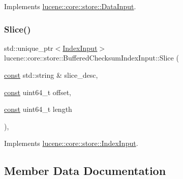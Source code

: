 Implements \mbox{\hyperlink{classlucene_1_1core_1_1store_1_1DataInput_aa5f24102b9b50a190bcb7a8edb82ea2d}{lucene\+::core\+::store\+::\+Data\+Input}}.

\mbox{\label{classlucene_1_1core_1_1store_1_1BufferedChecksumIndexInput_a3dbbd2618e6ab6dfeee220ae5b6b8cda}} 
\subsubsection{\texorpdfstring{Slice()}{Slice()}}
{\footnotesize\ttfamily std\+::unique\+\_\+ptr$<$\mbox{\hyperlink{classlucene_1_1core_1_1store_1_1IndexInput}{Index\+Input}}$>$ lucene\+::core\+::store\+::\+Buffered\+Checksum\+Index\+Input\+::\+Slice (\begin{DoxyParamCaption}\item[{\mbox{\hyperlink{ZlibCrc32_8h_a2c212835823e3c54a8ab6d95c652660e}{const}} std\+::string \&}]{slice\+\_\+desc,  }\item[{\mbox{\hyperlink{ZlibCrc32_8h_a2c212835823e3c54a8ab6d95c652660e}{const}} uint64\+\_\+t}]{offset,  }\item[{\mbox{\hyperlink{ZlibCrc32_8h_a2c212835823e3c54a8ab6d95c652660e}{const}} uint64\+\_\+t}]{length }\end{DoxyParamCaption})\hspace{0.3cm}{\ttfamily [inline]}, {\ttfamily [virtual]}}



Implements \mbox{\hyperlink{classlucene_1_1core_1_1store_1_1IndexInput_a3a2d71caf506c20d7c866bdcda5e0171}{lucene\+::core\+::store\+::\+Index\+Input}}.



\subsection{Member Data Documentation}
\mbox{\label{classlucene_1_1core_1_1store_1_1BufferedChecksumIndexInput_a03959da784c91f969b5541e9c375cdb5}} 
